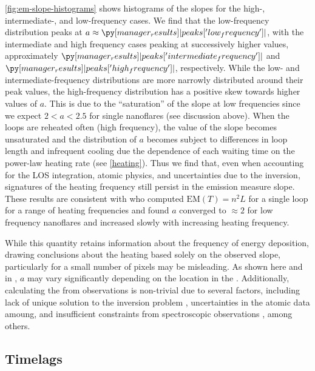 \autoref{fig:em-slope-histograms} shows histograms of the \dem{} slopes for the high-, intermediate-, and low-frequency cases. We find that the low-frequency distribution peaks at $a\approx\py[manager_results]|peaks['low_frequency']|$, with the intermediate and high frequency cases peaking at successively higher values, approximately $\py[manager_results]|peaks['intermediate_frequency']|$ and $\py[manager_results]|peaks['high_frequency']|$, respectively. While the low- and intermediate-frequency distributions are more narrowly distributed around their peak values, the high-frequency distribution has a positive skew towards higher values of $a$. This is due to the ``saturation'' of the slope at low frequencies since we expect $2<a<2.5$ for single nanoflares (see discussion above). When the loops are reheated often (high frequency), the value of the slope becomes unsaturated and the distribution of $a$ becomes subject to differences in loop length and infrequent cooling due the dependence of each waiting time on the power-law heating rate (see \autoref{heating}). Thus we find that, even when accounting for the LOS integration, atomic physics, and uncertainties due to the \dem{} inversion, signatures of the heating frequency still persist in the emission measure slope. These results are consistent with \citet{cargill_active_2014} who computed $\mathrm{EM}(T)=n^2L$ for a single loop for a range of heating frequencies and found $a$ converged to $\approx2$ for low frequency nanoflares and increased slowly with increasing heating frequency. 

While this quantity retains information about the frequency of energy deposition, drawing conclusions about the heating based solely on the observed \dem{} slope, particularly for a small number of pixels may be misleading. As shown here and in \citet{del_zanna_evolution_2015}, $a$ may vary significantly depending on the location in the \AR{}. Additionally, calculating the \dem{} from observations is non-trivial due to several factors, including lack of unique solution to the inversion problem \citep[e.g.][]{aschwanden_benchmark_2015}, uncertainties in the atomic data amoung, and insufficient constraints from spectroscopic observations \citep[e.g.][]{landi_isothermality_2010,winebarger_defining_2012}, among others. 

\subsection{Timelags}\label{timelags}

